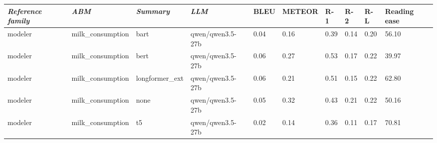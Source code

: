 \begin{tabular}{|l|l|l|l|l|l|l|l|l|l|}
\hline
\textit{\textbf{Reference family}} & \textit{\textbf{ABM}} & \textit{\textbf{Summary}} & \textit{\textbf{LLM}} & BLEU & METEOR & R-1 & R-2 & R-L & Reading ease \\
 \hline
 modeler & milk\_consumption & bart & qwen/qwen3.5-27b & 0.04 & 0.16 & 0.39 & 0.14 & 0.20 & 56.10 \\
 \hline
 modeler & milk\_consumption & bert & qwen/qwen3.5-27b & 0.06 & 0.27 & 0.53 & 0.17 & 0.22 & 39.97 \\
 \hline
 modeler & milk\_consumption & longformer\_ext & qwen/qwen3.5-27b & 0.06 & 0.21 & 0.51 & 0.15 & 0.22 & 62.80 \\
 \hline
 modeler & milk\_consumption & none & qwen/qwen3.5-27b & 0.05 & 0.32 & 0.43 & 0.21 & 0.22 & 50.16 \\
 \hline
 modeler & milk\_consumption & t5 & qwen/qwen3.5-27b & 0.02 & 0.14 & 0.36 & 0.11 & 0.17 & 70.81 \\
\hline
\end{tabular}
